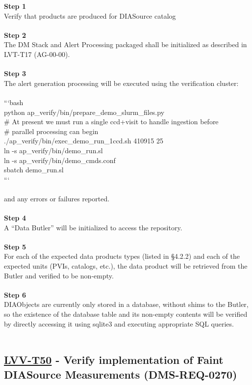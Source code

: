 \textbf{Step 1}\\
Verify that products are produced for DIASource catalog\\
~\\
\textbf{Step 2}\\
The DM Stack and Alert Processing packaged shall be initialized as
described in LVT-T17 (AG-00-00).\\
~\\
\textbf{Step 3}\\
The alert generation processing will be executed using the verification
cluster:\\
~\\
```bash\\
python ap\_verify/bin/prepare\_demo\_slurm\_files.py\\
\# At present we must run a single ccd+visit to handle ingestion
before\\
\# parallel processing can begin\\
./ap\_verify/bin/exec\_demo\_run\_1ccd.sh 410915 25\\
ln -s ap\_verify/bin/demo\_run.sl\\
ln -s ap\_verify/bin/demo\_cmds.conf\\
sbatch demo\_run.sl\\
```\\
~\\
and any errors or failures reported.\\
~\\
\textbf{Step 4}\\
A ``Data Butler'' will be initialized to access the repository.\\
~\\
\textbf{Step 5}\\
For each of the expected data products types (listed in §4.2.2) and each
of the expected units (PVIs, catalogs, etc.), the data product will be
retrieved from the Butler and verified to be non-empty.\\
~\\
\textbf{Step 6}\\
DIAObjects are currently only stored in a database, without shims to the
Butler, so the existence of the database table and its non-empty
contents will be verified by directly accessing it using sqlite3 and
executing appropriate SQL queries.\\
~\\

\hypertarget{lvv-t50---verify-implementation-of-faint-diasource-measurements-dms-req-0270}{%
\subsection{\texorpdfstring{\href{https://jira.lsstcorp.org/secure/Tests.jspa\#/testCase/LVV-T50}{LVV-T50}
- Verify implementation of Faint DIASource Measurements
(DMS-REQ-0270)}{LVV-T50 - Verify implementation of Faint DIASource Measurements (DMS-REQ-0270)}}\label{lvv-t50---verify-implementation-of-faint-diasource-measurements-dms-req-0270}}

